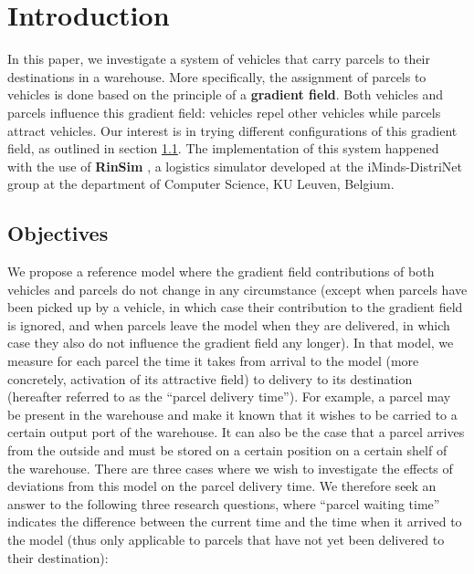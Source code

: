 \section{Introduction}\label{sec:intro}
In this paper, we investigate a system of vehicles that carry parcels to their destinations in a warehouse. More specifically, the assignment of parcels to vehicles is done based on the principle of a \textbf{gradient field}. Both vehicles and parcels influence this gradient field: vehicles repel other vehicles while parcels attract vehicles. Our interest is in trying different configurations of this gradient field, as outlined in section \ref{sec:objectives}. The implementation of this system happened with the use of \textbf{RinSim} \cite{rinsim}, a logistics simulator developed at the iMinds-DistriNet group at the department of Computer Science, KU Leuven, Belgium.

\subsection{Objectives}\label{sec:objectives}
We propose a reference model where the gradient field contributions of both vehicles and parcels do not change in any circumstance (except when parcels have been picked up by a vehicle, in which case their contribution to the gradient field is ignored, and when parcels leave the model when they are delivered, in which case they also do not influence the gradient field any longer). In that model, we measure for each parcel the time it takes from arrival to the model (more concretely, activation of its attractive field) to delivery to its destination (hereafter referred to as the ``parcel delivery time''). For example, a parcel may be present in the warehouse and make it known that it wishes to be carried to a certain output port of the warehouse. It can also be the case that a parcel arrives from the outside and must be stored on a certain position on a certain shelf of the warehouse.
There are three cases where we wish to investigate the effects of deviations from this model on the parcel delivery time. We therefore seek an answer to the following three research questions, where ``parcel waiting time'' indicates the difference between the current time and the time when it arrived to the model (thus only applicable to parcels that have not yet been delivered to their destination):

